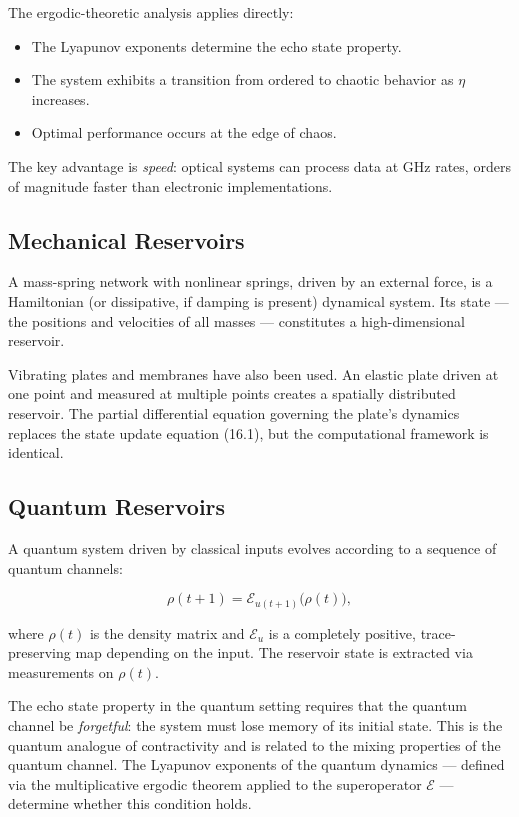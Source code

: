 The ergodic-theoretic analysis applies directly:
\begin{itemize}[nosep]
  \item The Lyapunov exponents determine the echo state property.
  \item The system exhibits a transition from ordered to chaotic behavior as $\eta$ increases.
  \item Optimal performance occurs at the edge of chaos.
\end{itemize}

The key advantage is \textit{speed}: optical systems can process data at GHz rates, orders of magnitude faster than electronic implementations.

\subsection{Mechanical Reservoirs}\label{sec:16.6.3}

A mass-spring network with nonlinear springs, driven by an external force, is a Hamiltonian (or dissipative, if damping is present) dynamical system. Its state --- the positions and velocities of all masses --- constitutes a high-dimensional reservoir.

Vibrating plates and membranes have also been used. An elastic plate driven at one point and measured at multiple points creates a spatially distributed reservoir. The partial differential equation governing the plate's dynamics replaces the state update equation (16.1), but the computational framework is identical.

\subsection{Quantum Reservoirs}\label{sec:16.6.4}

A quantum system driven by classical inputs evolves according to a sequence of quantum channels:

\[
\rho(t+1) = \mathcal{E}_{u(t+1)}\bigl(\rho(t)\bigr),
\]

where $\rho(t)$ is the density matrix and $\mathcal{E}_u$ is a completely positive, trace-preserving map depending on the input. The reservoir state is extracted via measurements on $\rho(t)$.

The echo state property in the quantum setting requires that the quantum channel be \textit{forgetful}: the system must lose memory of its initial state. This is the quantum analogue of contractivity and is related to the mixing properties of the quantum channel. The Lyapunov exponents of the quantum dynamics --- defined via the multiplicative ergodic theorem applied to the superoperator $\mathcal{E}$ --- determine whether this condition holds.

